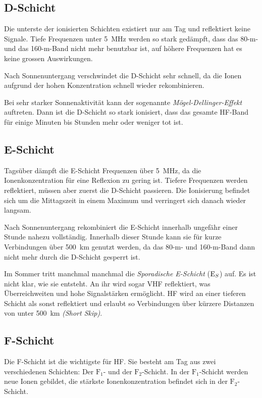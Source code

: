 \subsection{D-Schicht}
Die unterste der ionisierten Schichten existiert nur am Tag und reflektiert keine Signale. Tiefe Frequenzen unter 5 MHz werden so stark gedämpft, dass das 80-m- und das 160-m-Band nicht mehr benutzbar ist, auf höhere Frequenzen hat es keine grossen Auswirkungen.

Nach Sonnenuntergang verschwindet die D-Schicht sehr schnell, da die Ionen aufgrund der hohen Konzentration schnell wieder rekombinieren.

Bei sehr starker Sonnenaktivität kann der sogenannte \textit{Mögel-Dellinger-Effekt} auftreten. Dann ist die D-Schicht so stark ionisiert, dass das gesamte HF-Band für einige Minuten bis Stunden mehr oder weniger tot ist.

\subsection{E-Schicht}
Tagsüber dämpft die E-Schicht Frequenzen über 5 MHz, da die Ionenkonzentration für eine Reflexion zu gering ist. Tiefere Frequenzen werden reflektiert, müssen aber zuerst die D-Schicht passieren. Die Ionisierung befindet sich um die Mittagszeit in einem Maximum und verringert sich danach wieder langsam.

Nach Sonnenuntergang rekombiniert die E-Schicht innerhalb ungefähr einer Stunde nahezu vollständig. Innerhalb dieser Stunde kann sie für kurze Verbindungen über 500 km genutzt werden, da das 80-m- und 160-m-Band dann nicht mehr durch die D-Schicht gesperrt ist.

Im Sommer tritt manchmal manchmal die \textit{Sporadische E-Schicht} ($\textrm E_S$) auf. Es ist nicht klar, wie sie entsteht. An ihr wird sogar VHF reflektiert, was Überreichweiten und hohe Signalstärken ermöglicht. HF wird an einer tieferen Schicht als sonst reflektiert und erlaubt so Verbindungen über kürzere Distanzen von unter 500 km \textit{(Short Skip)}.

\subsection{F-Schicht}
Die F-Schicht ist die wichtigste für HF. Sie besteht am Tag aus zwei verschiedenen Schichten: Der $\mathrm F_1$- und der $\mathrm F_2$-Schicht. In der $\mathrm F_1$-Schicht werden neue Ionen gebildet, die stärkste Ionenkonzentration befindet sich in der $\mathrm F_2$-Schicht. 

